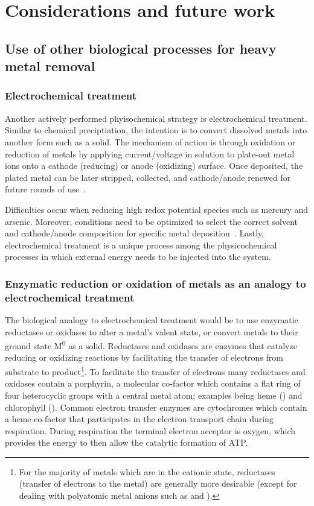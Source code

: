 \documentclass[../main/main]{subfiles}
\begin{document}
\chapter{Considerations and future work}
\label{chapter5}
\renewcommand{\figurename}{Figure}

\section{Use of other biological processes for heavy metal removal}

\subsection*{Electrochemical treatment}
Another actively performed phyisochemical strategy is electrochemical treatment. Similar to chemical preciptiation, the intention is to convert dissolved metals into another form such as a solid. The mechanism of action is through oxidation or reduction of metals by applying current/voltage in solution to plate-out metal ions onto a cathode (reducing) or anode (oxidizing) surface. Once deposited, the plated metal can be later stripped, collected, and cathode/anode renewed for future rounds of use~\cite{wang2007mechanism}.

Difficulties occur when reducing high redox potential species such as mercury and arsenic. Moreover, conditions need to be optimized to select the correct solvent and cathode/anode composition for specific metal deposition~\cite{fu2011removal}. Lastly, electrochemical treatment is a unique process among the physicochemical processes in which external energy needs to be injected into the system.

\subsection*{Enzymatic reduction or oxidation of metals as an analogy to electrochemical treatment}
The biological analogy to electrochemical treatment would be to use enzymatic reductases or oxidases to alter a metal's valent state, or convert metals to their ground state M\textsuperscript{0} as a solid. Reductases and oxidases are enzymes that catalyze reducing or oxidizing reactions by facilitating the transfer of electrons from substrate to product\footnote{
	For the majority of metals which are in the cationic state, reductases (transfer of electrons to the metal) are generally more desirable (except for dealing with polyatomic metal anions such as  and ).
}. To facilitate the transfer of electrons many reductases and oxidases contain a porphyrin, a molecular co-factor which contains a flat ring of four heterocyclic groups with a central metal atom; examples being heme () and chlorophyll (). Common electron transfer enzymes are cytochromes which contain a heme co-factor that participates in the electron transport chain during respiration. During respiration the terminal electron acceptor is oxygen, which provides the energy to then allow the catalytic formation of ATP.
\end{document}
